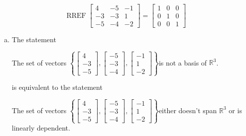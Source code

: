 \begin{exerciseAnswer} 


\[\operatorname{RREF} \left[\begin{array}{ccc}
4 & -5 & -1 \\
-3 & -3 & 1 \\
-5 & -4 & -2
\end{array}\right] = \left[\begin{array}{ccc}
1 & 0 & 0 \\
0 & 1 & 0 \\
0 & 0 & 1
\end{array}\right] \]


\begin{enumerate}[(a)]
\item The statement 
\begin{center}\begin{minipage}{0.8\textwidth}
 The set of vectors \( \left\{ \left[\begin{array}{c}
4 \\
-3 \\
-5
\end{array}\right] , \left[\begin{array}{c}
-5 \\
-3 \\
-4
\end{array}\right] , \left[\begin{array}{c}
-1 \\
1 \\
-2
\end{array}\right] \right\} \)is not a basis of \(\mathbb{R}^3\). 
\end{minipage}\end{center}
     is equivalent to the statement 
\begin{center}\begin{minipage}{0.8\textwidth}
 The set of vectors \( \left\{ \left[\begin{array}{c}
4 \\
-3 \\
-5
\end{array}\right] , \left[\begin{array}{c}
-5 \\
-3 \\
-4
\end{array}\right] , \left[\begin{array}{c}
-1 \\
1 \\
-2
\end{array}\right] \right\} \)either doesn't span \(\mathbb{R}^3\) or is linearly dependent.
\end{minipage}\end{center}
    

\end{enumerate}
\end{exerciseAnswer}
